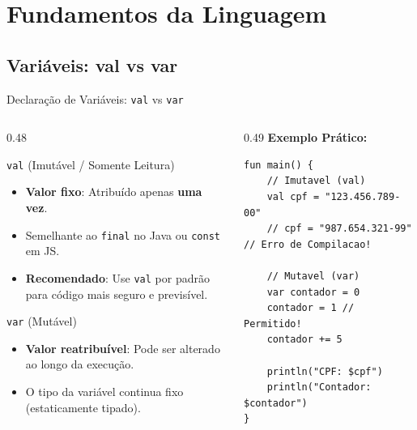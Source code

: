 \documentclass[aspectratio=169]{beamer}
\begin{document}
\section{Fundamentos da Linguagem}

\subsection{Variáveis: val vs var}

\begin{frame}[fragile]{Declaração de Variáveis: \texttt{val} vs \texttt{var}}
  \begin{columns}[T]
    \begin{column}{0.48\textwidth}
      \begin{block}{\centering \texttt{val} (Imutável / Somente Leitura)}
        \vspace{0.2em}
        \begin{itemize}\small
          \item \textbf{Valor fixo}: Atribuído apenas \textbf{uma vez}.
          \item Semelhante ao \texttt{final} no Java ou \texttt{const} em JS.
          \item \textbf{Recomendado}: Use \texttt{val} por padrão para código mais seguro e previsível.
        \end{itemize}
      \end{block}
      
      \vspace{0.4em}
      
      \begin{block}{\centering \texttt{var} (Mutável)}
        \vspace{0.2em}
        \begin{itemize}\small
          \item \textbf{Valor reatribuível}: Pode ser alterado ao longo da execução.
          \item O tipo da variável continua fixo (estaticamente tipado).
        \end{itemize}
      \end{block}
    \end{column}

    \begin{column}{0.49\textwidth}
      \textbf{Exemplo Prático:}
      \vspace{0.2em}

\begin{lstlisting}[style=KotlinStyle]
fun main() {
    // Imutavel (val)
    val cpf = "123.456.789-00"
    // cpf = "987.654.321-99" // Erro de Compilacao!

    // Mutavel (var)
    var contador = 0
    contador = 1 // Permitido!
    contador += 5

    println("CPF: $cpf")
    println("Contador: $contador")
}
\end{lstlisting}
    \end{column}
  \end{columns}
\end{frame}
\end{document}
